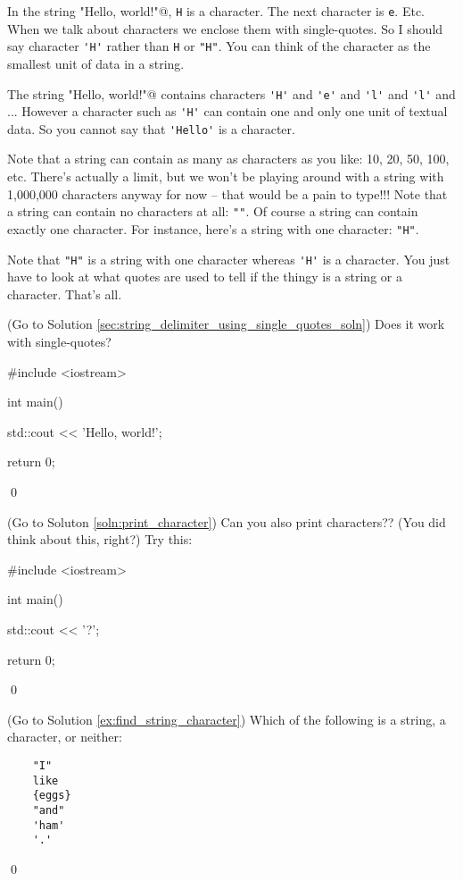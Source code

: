 In the string 
\verb@"Hello, world!\n"@, 
\verb!H! is a character. 
The next character is \verb!e!. Etc. 
When we talk about characters we enclose them with single-quotes. 
So I should say character \verb!'H'! rather than 
\verb!H! or \verb!"H"!. 
You can think of the character as the smallest unit of data in a string. 

The string \verb@"Hello, world!\n"@ contains characters 
\verb!'H'! and \verb!'e'! and \verb!'l'! and \verb!'l'! and 
... 
However a character such as 
\verb!'H'! can contain one and only one unit of textual data. 
So you cannot say that \verb!'Hello'! is a character. 

Note that a string can contain as many as characters as you like: 
10, 20, 50, 100, etc. 
There's actually a limit, but we won't be playing around with a string with 
1,000,000 characters anyway for now --
that would be a pain to type!!! 
Note that a string can contain no characters at all: 
\verb!""!. 
Of course a string can contain exactly one character. 
For instance, here's a string with one character: \verb!"H"!. 

Note that \verb!"H"! is a string with one character whereas 
\verb!'H'! is a character. 
You just have to look at what quotes are used to tell if the thingy is a 
string or a character. That's all.


\begin{ex} \label{sec:string_delimiter_using_single_quotes} 
(Go to Solution \ref{sec:string_delimiter_using_single_quotes_soln})
Does it work with single-quotes?
\begin{console}
#include <iostream>

int main()
{
    std::cout << 'Hello, world!\n';

    return 0;
}
\end{console}
\qed
\end{ex}


\begin{ex} \label{ex:print_character}
(Go to Soluton \ref{soln:print_character})
Can you also print characters?? (You did think about this, right?) Try this:
\begin{console}
#include <iostream>

int main()
{
    std::cout << '?';

    return 0;
}
\end{console}
\qed
\end{ex}


\begin{ex} \label{soln:find_string_character}
(Go to Solution \ref{ex:find_string_character})
Which of the following is a string, a character, or neither:
\begin{verbatim}
    "I"      
    like     
    {eggs}   
    "and"    
    'ham'    
    '.'      
\end{verbatim}
\qed
\end{ex}


